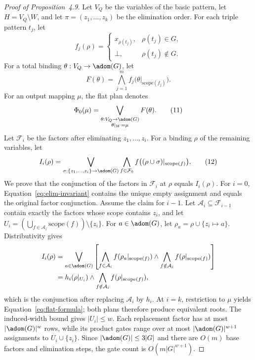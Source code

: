 \documentclass[sigconf, nonacm]{acmart}
\begin{document}
\begin{proof}[Proof of Proposition~4.9]
Let $V_Q$ be the variables of the basic pattern, let $H=V_Q\setminus W$, and let $\pi=(z_1,\ldots,z_k)$ be the elimination order. For each triple pattern $t_j$, let
\[
 f_j(\rho)=
 \begin{cases}
 x_{\rho(t_j)},&\rho(t_j)\in G,\\
 \bot,&\rho(t_j)\notin G.
 \end{cases}
\]
For a total binding $\theta:V_Q\to\adom(G)$, let
\[
 F(\theta)=\bigwedge_{j=1}^{m}f_j\bigl(\theta|_{\mathrm{scope}(f_j)}\bigr).
\]
For an output mapping $\mu$, the flat plan denotes
\[
 \Phi_0(\mu)=
 \bigvee_{\substack{\theta:V_Q\to\adom(G)\\\theta|_W=\mu}}F(\theta).
 \tag{11}\label{eq:flat-formula}
\]
Let $\mathcal F_i$ be the factors after eliminating $z_1,\ldots,z_i$. For a binding $\rho$ of the remaining variables, let
\[
 I_i(\rho)=
 \bigvee_{\sigma:\{z_1,\ldots,z_i\}\to\adom(G)}
 \bigwedge_{f\in\mathcal F_0}
 f\bigl((\rho\cup\sigma)|_{\mathrm{scope}(f)}\bigr).
 \tag{12}\label{eq:elim-invariant}
\]
We prove that the conjunction of the factors in $\mathcal F_i$ at $\rho$ equals $I_i(\rho)$.
For $i=0$, Equation~\eqref{eq:elim-invariant} contains the unique empty assignment and equals the original factor conjunction.
Assume the claim for $i-1$. Let $\mathcal A_i\subseteq\mathcal F_{i-1}$ contain exactly the factors whose scope contains $z_i$, and let $U_i=(\bigcup_{f\in\mathcal A_i}\mathrm{scope}(f))\setminus\{z_i\}$. For $a\in\adom(G)$, let $\rho_a=\rho\cup\{z_i\mapsto a\}$. Distributivity gives
\begin{align*}
 I_i(\rho)
 &=\bigvee_{a\in\adom(G)}
 \left[
 \bigwedge_{f\in\mathcal A_i} f(\rho_a|_{\mathrm{scope}(f)})
 \land
 \bigwedge_{f\notin\mathcal A_i} f(\rho|_{\mathrm{scope}(f)})
 \right]\\
 &=h_i(\rho|_{U_i})\land
 \bigwedge_{f\notin\mathcal A_i} f(\rho|_{\mathrm{scope}(f)}),
\end{align*}
which is the conjunction after replacing $\mathcal A_i$ by $h_i$. At $i=k$, restriction to $\mu$ yields Equation~\eqref{eq:flat-formula}; both plans therefore produce equivalent roots.
The induced-width bound gives $|U_i|\le w$. Each replacement factor has at most $|\adom(G)|^w$ rows, while its product gates range over at most $|\adom(G)|^{w+1}$ assignments to $U_i\cup\{z_i\}$. Since $|\adom(G)|\le3|G|$ and there are $O(m)$ base factors and elimination steps, the gate count is $O(m|G|^{w+1})$.
\end{proof}
\end{document}
